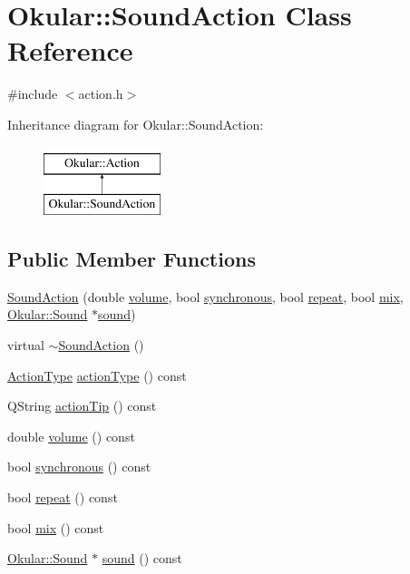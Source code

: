 \hypertarget{classOkular_1_1SoundAction}{\section{Okular\+:\+:Sound\+Action Class Reference}
\label{classOkular_1_1SoundAction}
}


{\ttfamily \#include $<$action.\+h$>$}

Inheritance diagram for Okular\+:\+:Sound\+Action\+:\begin{figure}[H]
\begin{center}
\leavevmode
\includegraphics[height=2.000000cm]{classOkular_1_1SoundAction}
\end{center}
\end{figure}
\subsection*{Public Member Functions}
\begin{DoxyCompactItemize}
\item 
\hyperlink{classOkular_1_1SoundAction_a00e8d9b3dea4b0a03a10d869e38b57a2}{Sound\+Action} (double \hyperlink{classOkular_1_1SoundAction_ab8932519cb7c662a7163d913131c3307}{volume}, bool \hyperlink{classOkular_1_1SoundAction_a28855e4de48eb6212013a457d3eb9dda}{synchronous}, bool \hyperlink{classOkular_1_1SoundAction_a3fc908be10b8113ba72c7988c420cd23}{repeat}, bool \hyperlink{classOkular_1_1SoundAction_ac714168b6f391e2e1f2d3df3dc9a0c33}{mix}, \hyperlink{classOkular_1_1Sound}{Okular\+::\+Sound} $\ast$\hyperlink{classOkular_1_1SoundAction_aeca8e94b61e8b5a1c9ee5abf35b6569a}{sound})
\item 
virtual \hyperlink{classOkular_1_1SoundAction_ad367be264670f8a4e6d8b51a205c1bec}{$\sim$\+Sound\+Action} ()
\item 
\hyperlink{classOkular_1_1Action_abe474735af30ea76105595533df9ec47}{Action\+Type} \hyperlink{classOkular_1_1SoundAction_a9f73cbcd3d77b77428e937b6ca83668c}{action\+Type} () const 
\item 
Q\+String \hyperlink{classOkular_1_1SoundAction_ae0bbcde29f828f1d5bcfddc0b4c7f0cd}{action\+Tip} () const 
\item 
double \hyperlink{classOkular_1_1SoundAction_ab8932519cb7c662a7163d913131c3307}{volume} () const 
\item 
bool \hyperlink{classOkular_1_1SoundAction_a28855e4de48eb6212013a457d3eb9dda}{synchronous} () const 
\item 
bool \hyperlink{classOkular_1_1SoundAction_a3fc908be10b8113ba72c7988c420cd23}{repeat} () const 
\item 
bool \hyperlink{classOkular_1_1SoundAction_ac714168b6f391e2e1f2d3df3dc9a0c33}{mix} () const 
\item 
\hyperlink{classOkular_1_1Sound}{Okular\+::\+Sound} $\ast$ \hyperlink{classOkular_1_1SoundAction_aeca8e94b61e8b5a1c9ee5abf35b6569a}{sound} () const 
\end{DoxyCompactItemize}
